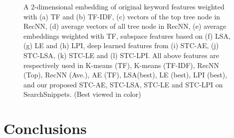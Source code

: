 \documentclass[review]{elsarticle}
\begin{document}
\begin{figure}[h!]
\centering
\vspace{-0.1cm}
\vspace{-0.1cm}
\vspace{-0.1cm}
\vspace{-0.1cm}
\vspace{-0.1cm}
\vspace{-0.1cm}
\vspace{-0.1cm}
\vspace{-0.1cm}
\vspace{-0.1cm}
\vspace{-0.1cm}
\vspace{-0.1cm}
\vspace{-0.1cm}
\vspace{-0.1cm}
\vspace{-0.1cm}
\caption{A 2-dimensional embedding of original keyword features weighted with (a) TF and (b) TF-IDF, (c) vectors of the top tree node in RecNN, (d) average vectors of all tree node in RecNN, (e) average embeddings weighted with TF, subspace features based on (f) LSA, (g) LE and (h) LPI, deep learned features from (i) STC-AE, (j) STC-LSA, (k) STC-LE and (l) STC-LPI. All above features are respectively used in K-means (TF), K-means (TF-IDF), RecNN (Top), RecNN (Ave.), AE (TF), LSA(best), LE (best), LPI (best), and our proposed STC-AE, STC-LSA, STC-LE and STC-LPI on SearchSnippets. (Best viewed in color)}
\vspace{-0.2cm}
\label{fig:all2dSearchSnippets}
\end{figure}

\section{Conclusions}
\label{sec:DiscussionANDConclusions}
\end{document}
